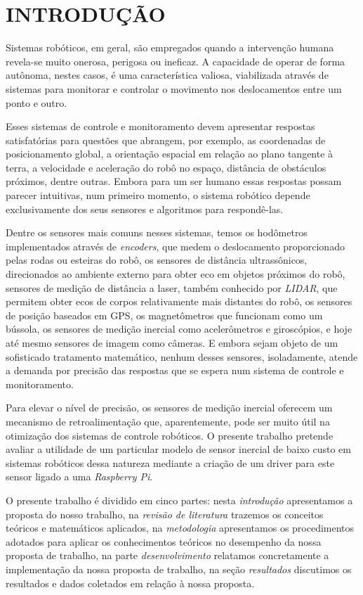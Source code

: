 \chapter*{INTRODUÇÃO}\label{chap:introducao}

Sistemas robóticos, em geral, são empregados quando a intervenção humana
revela-se muito onerosa, perigosa ou ineficaz. A capacidade de operar de forma
autônoma, nestes casos, é uma característica valiosa, viabilizada através de
sistemas para monitorar e controlar o movimento nos deslocamentos entre um
ponto e outro.

Esses sistemas de controle e monitoramento devem apresentar respostas
satisfatórias para questões que abrangem, por exemplo, as coordenadas de
posicionamento global, a orientação espacial em relação ao plano tangente à
terra, a velocidade e aceleração do robô no espaço, distância de obstáculos
próximos, dentre outras. Embora para um ser humano essas respostas possam
parecer intuitivas, num primeiro momento, o sistema robótico depende
exclusivamente dos seus sensores e algoritmos para respondê-las.

Dentre os sensores mais comuns nesses sistemas, temos os hodômetros
implementados através de \emph{encoders}, que medem o deslocamento
proporcionado pelas rodas ou esteiras do robô, os sensores de distância
ultrassônicos, direcionados ao ambiente externo para obter eco em objetos
próximos do robô, sensores de medição de distância a laser, também conhecido
por \emph{LIDAR}, que permitem obter ecos de corpos relativamente mais
distantes do robô, os sensores de posição baseados em GPS, os magnetômetros que
funcionam como um bússola, os sensores de medição inercial como acelerômetros e
giroscópios, e hoje até mesmo sensores de imagem como câmeras. E embora sejam
objeto de um sofisticado tratamento matemático, nenhum desses sensores,
isoladamente, atende a demanda por precisão das respostas que se espera num
sistema de controle e monitoramento.

Para elevar o nível de precisão, os sensores de medição inercial oferecem um
mecanismo de retroalimentação que, aparentemente, pode ser muito útil na
otimização dos sistemas de controle robóticos. O presente trabalho pretende
avaliar a utilidade de um particular modelo de sensor inercial de baixo custo
em sistemas robóticos dessa natureza mediante a criação de um driver para este
sensor ligado a uma \emph{Raspberry Pi}.

O presente trabalho é dividido em cinco partes: nesta \emph{introdução} apresentamos a proposta do nosso trabalho, na \emph{revisão de literatura} trazemos os conceitos teóricos e matemáticos aplicados, na \emph{metodologia} apresentamos os procedimentos adotados para aplicar os conhecimentos teóricos no desempenho da nossa proposta de trabalho, na parte \emph{desenvolvimento} relatamos concretamente a implementação da nossa proposta de trabalho, na seção \emph{resultados} discutimos os resultados e dados coletados em relação à nossa proposta.
